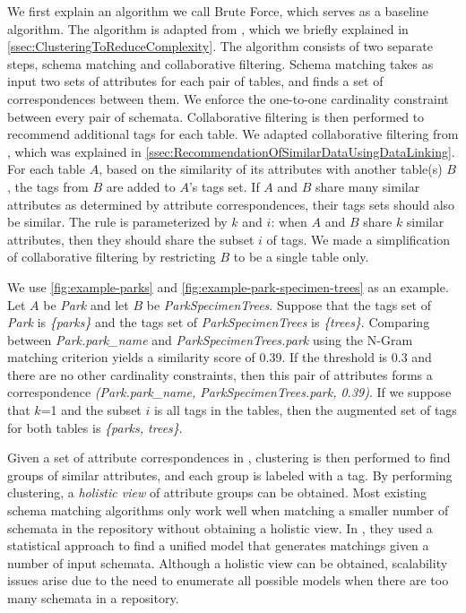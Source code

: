 We first explain an algorithm we call Brute Force, which serves as a baseline algorithm. The algorithm is adapted from \cite{Smith2011Unity}, which we briefly explained in \autoref{ssec:ClusteringToReduceComplexity}. The algorithm consists of two separate steps, schema matching and collaborative filtering. Schema matching takes as input two sets of attributes for each pair of tables, and finds a set of correspondences between them. We enforce the one-to-one cardinality constraint between every pair of schemata. Collaborative filtering is then performed to recommend additional tags for each table. We adapted collaborative filtering from \cite{conf/esws/EllefiBDT16}, which was explained in \autoref{ssec:RecommendationOfSimilarDataUsingDataLinking}. For each table $A$, based on the similarity of its attributes with another table(s) $B$, the tags from $B$ are added to $A$'s tags set. If $A$ and $B$ share many similar attributes as determined by attribute correspondences, their tags sets should also be similar. The rule is parameterized by $k$ and $i$: when $A$ and $B$ share $k$ similar attributes, then they should share the subset $i$ of tags. We made a simplification of collaborative filtering by restricting $B$ to be a single table only.

We use \autoref{fig:example-parks} and \autoref{fig:example-park-specimen-trees} as an example. Let $A$ be \textit{Park} and let $B$ be \textit{ParkSpecimenTrees}. Suppose that the tags set of \textit{Park} is \textit{\{parks\}} and the tags set of \textit{ParkSpecimenTrees} is \textit{\{trees\}}. Comparing between \textit{Park.park\_name} and \textit{ParkSpecimenTrees.park} using the N-Gram matching criterion yields a similarity score of 0.39. If the threshold is 0.3 and there are no other cardinality constraints, then this pair of attributes forms a correspondence \textit{(Park.park\_name, ParkSpecimenTrees.park, 0.39)}. If we suppose that $k$=1 and the subset $i$ is all tags in the tables, then the augmented set of tags for both tables is \textit{\{parks, trees\}}.

Given a set of attribute correspondences in \cite{Smith2011Unity}, clustering is then performed to find groups of similar attributes, and each group is labeled with a tag. By performing clustering, a \textit{holistic view} of attribute groups can be obtained. Most existing schema matching algorithms only work well when matching a smaller number of schemata in the repository without obtaining a holistic view. In \cite{10.1145/2396761.2398468}, they used a statistical approach to find a unified model that generates matchings given a number of input schemata. Although a holistic view can be obtained, scalability issues arise due to the need to enumerate all possible models when there are too many schemata in a repository.

